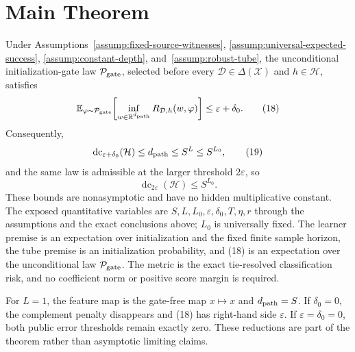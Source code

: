 \section{Main Theorem}
\label{sec:main-theorem}

\begin{theorem}
\label{thm:main}
Under Assumptions~\ref{assump:fixed-source-witnesses},
\ref{assump:universal-expected-success},
\ref{assump:constant-depth}, and~\ref{assump:robust-tube}, the unconditional
initialization-gate law $\mathcal P_{\rm gate}$, selected before every
$\mathcal D\in\Delta(\mathcal X)$ and $h\in\mathcal H$, satisfies
\[
\mathbb E_{\varphi\sim\mathcal P_{\rm gate}}\!\left[
\inf_{w\in\mathbb R^{d_{\rm path}}}
R_{\mathcal D,h}(w,\varphi)
\right]\leq\varepsilon+\delta_0.
\tag{18}
\]
Consequently,
\[
\operatorname{dc}_{\varepsilon+\delta_0}(\mathcal H)
\leq d_{\rm path}
\leq S^L
\leq S^{L_0},
\tag{19}
\]
and the same law is admissible at the larger threshold $2\varepsilon$, so
\[
\operatorname{dc}_{2\varepsilon}(\mathcal H)\leq S^{L_0}.
\tag{20}
\]
These bounds are nonasymptotic and have no hidden multiplicative constant.
The exposed quantitative variables are
$S,L,L_0,\varepsilon,\delta_0,T,\eta,r$ through the assumptions and the exact
conclusions above; $L_0$ is universally fixed.  The learner premise is an
expectation over initialization and the fixed finite sample horizon, the tube
premise is an initialization probability, and (18) is an expectation over the
unconditional law $\mathcal P_{\rm gate}$.  The metric is the exact
tie-resolved classification risk, and no coefficient norm or positive score
margin is required.
\end{theorem}

For $L=1$, the feature map is the gate-free map $x\mapsto x$ and
$d_{\rm path}=S$.  If $\delta_0=0$, the complement penalty disappears and
(18) has right-hand side $\varepsilon$.  If
$\varepsilon=\delta_0=0$, both public error thresholds remain exactly zero.
These reductions are part of the theorem rather than asymptotic limiting
claims.
